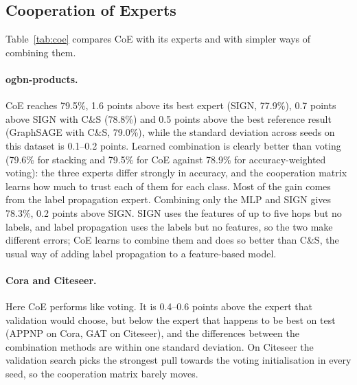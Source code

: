 \documentclass[sigconf,nonacm]{acmart}
\begin{document}
\subsection{Cooperation of Experts}
\label{sec:coe-results}

\begin{table}[t]
\caption{Test accuracy (\%) of CoE against its experts and simpler combinations. The expert in parentheses is the one with the best validation accuracy, which is the model one would deploy; the best expert on test is shown for reference. ogbn-products: one seed. $^\dagger$One round of self-training (see text); on the small graphs the number of rounds is chosen on validation.}
\label{tab:coe}

\end{table}

Table~\ref{tab:coe} compares CoE with its experts and with simpler ways of combining them.

\paragraph{ogbn-products.}
CoE reaches 79.5\%, 1.6 points above its best expert (SIGN, 77.9\%), 0.7 points above SIGN with C\&S (78.8\%) and 0.5 points above the best reference result (GraphSAGE with C\&S, 79.0\%), while the standard deviation across seeds on this dataset is 0.1--0.2 points.
Learned combination is clearly better than voting (79.6\% for stacking and 79.5\% for CoE against 78.9\% for accuracy-weighted voting): the three experts differ strongly in accuracy, and the cooperation matrix learns how much to trust each of them for each class.
Most of the gain comes from the label propagation expert.
Combining only the MLP and SIGN gives 78.3\%, 0.2 points above SIGN.
SIGN uses the features of up to five hops but no labels, and label propagation uses the labels but no features, so the two make different errors; CoE learns to combine them and does so better than C\&S, the usual way of adding label propagation to a feature-based model.

\paragraph{Cora and Citeseer.}
Here CoE performs like voting.
It is 0.4--0.6 points above the expert that validation would choose, but below the expert that happens to be best on test (APPNP on Cora, GAT on Citeseer), and the differences between the combination methods are within one standard deviation.
On Citeseer the validation search picks the strongest pull towards the voting initialisation in every seed, so the cooperation matrix barely moves.
\end{document}
